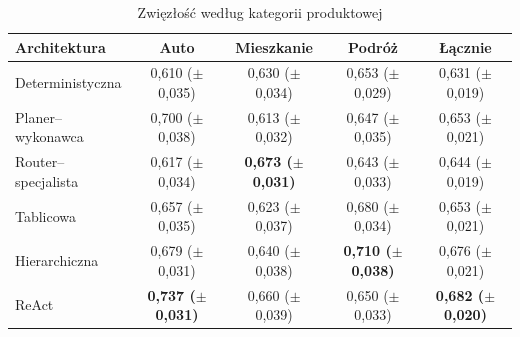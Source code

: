   \begin{table}[H]
    \caption{Zwięzłość według kategorii produktowej}\label{tab:zwiezlosc-kategoria}
    \centering
    \small
    \renewcommand{\arraystretch}{1.3}
    \begin{tabular}{@{} l c c c c @{}}
      \toprule
      \textbf{Architektura}
      & \textbf{Auto}
      & \textbf{Mieszkanie}
      & \textbf{Podróż}
      & \textbf{Łącznie}                                                                                                                              \\
      \midrule
      Deterministyczna    & 0{,}610 (\(\pm\) 0{,}035)          & 0{,}630 (\(\pm\) 0{,}034)          & 0{,}653 (\(\pm\) 0{,}029)          & 0{,}631 (\(\pm\) 0{,}019)          \\
      Planer--wykonawca   & 0{,}700 (\(\pm\) 0{,}038)          & 0{,}613 (\(\pm\) 0{,}032)          & 0{,}647 (\(\pm\) 0{,}035)          & 0{,}653 (\(\pm\) 0{,}021)          \\
      Router--specjalista & 0{,}617 (\(\pm\) 0{,}034)          & \textbf{0{,}673 (\(\pm\) 0{,}031)} & 0{,}643 (\(\pm\) 0{,}033)          & 0{,}644 (\(\pm\) 0{,}019)          \\
      Tablicowa           & 0{,}657 (\(\pm\) 0{,}035)          & 0{,}623 (\(\pm\) 0{,}037)          & 0{,}680 (\(\pm\) 0{,}034)          & 0{,}653 (\(\pm\) 0{,}021)          \\
      Hierarchiczna       & 0{,}679 (\(\pm\) 0{,}031)          & 0{,}640 (\(\pm\) 0{,}038)          & \textbf{0{,}710 (\(\pm\) 0{,}038)} & 0{,}676 (\(\pm\) 0{,}021)          \\
      ReAct               & \textbf{0{,}737 (\(\pm\) 0{,}031)} & 0{,}660 (\(\pm\) 0{,}039)          & 0{,}650 (\(\pm\) 0{,}033)          & \textbf{0{,}682 (\(\pm\) 0{,}020)} \\
      \bottomrule
    \end{tabular}
  \end{table}

